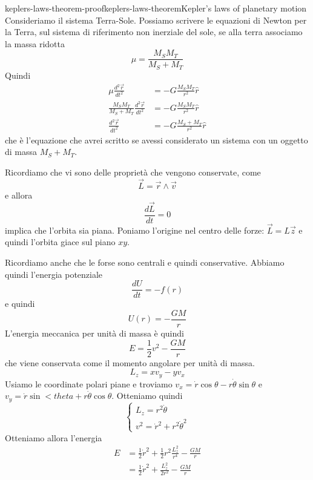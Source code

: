 \documentclass[preview]{standalone}
\begin{document}
\begin{snippetproof}{keplers-laws-theorem-proof}{keplers-laws-theorem}{Kepler's laws of planetary motion}
    Consideriamo il sistema Terra-Sole.
    Possiamo scrivere le equazioni di Newton per la Terra, sul sistema di riferimento
    non inerziale del sole, se alla terra associamo la massa ridotta
    \[
        \mu = \frac{M_S M_T}{M_S + M_T}
    \]
    Quindi
    \begin{align*}
        \mu \frac{d^2\vec{r}}{dt^2} &= - G \frac{M_S M_T}{r^2} \hat{r} \\
        \frac{M_S M_T}{M_S + M_T} \frac{d^2\vec{r}}{dt^2} &= - G \frac{M_S M_T}{r^2} \hat{r} \\
        \frac{d^2\vec{r}}{dt^2} &= - G \frac{M_S + M_T}{r^2} \hat{r}
    \end{align*}
    che è l'equazione che avrei scritto se avessi considerato un sistema
    con un oggetto di massa \(M_S + M_T\).

    Ricordiamo che vi sono delle proprietà che vengono conservate, come
    \[
        \vec{L} = \vec{r} \wedge \vec{v}
    \]
    e allora
    \[
        \frac{d\vec{L}}{dt} = 0
    \]
    implica che l'orbita sia piana.
    Poniamo l'origine nel centro delle forze: \(\vec{L} = L\vec{z}\)
    e quindi l'orbita giace sul piano \(xy\).

    Ricordiamo anche che le forse sono centrali e quindi conservative.
    Abbiamo quindi l'energia potenziale
    \[
        \frac{dU}{dt} = -f(r)
    \]
    e quindi
    \[
        U(r) = - \frac{GM}{r}
    \]
    L'energia meccanica per unità di massa è quindi
    \[
        E = \frac{1}{2} v^2 - \frac{GM}{r}
    \]
    che viene conservata come il momento angolare per unità di massa.
    \[
        L_z = x v_y - y v_x
    \]
    Usiamo le coordinate polari piane
    e troviamo \(v_x = \dot{r}\cos\theta - r\dot{\theta}\sin\theta\)
    e \(v_y = \dot{r}\sin<theta + r\dot{\theta}\cos\theta\).
    Otteniamo quindi
    \[
        \begin{cases}
            L_z = r^2 \dot{\theta} \\
            v^2 = \dot{r}^2 + r^2 \dot{\theta}^2
        \end{cases}
    \]
    Otteniamo allora l'energia
    \begin{align*}
        E &= \frac{1}{2} \dot{r}^2 + \frac{1}{2}r^2 \frac{L_z^2}{r^4} - \frac{GM}{r} \\
        &= \frac{1}{2} \dot{r}^2 + \frac{L_z^2}{2r^2} - \frac{GM}{r}
    \end{align*}


\end{snippetproof}
\end{document}
